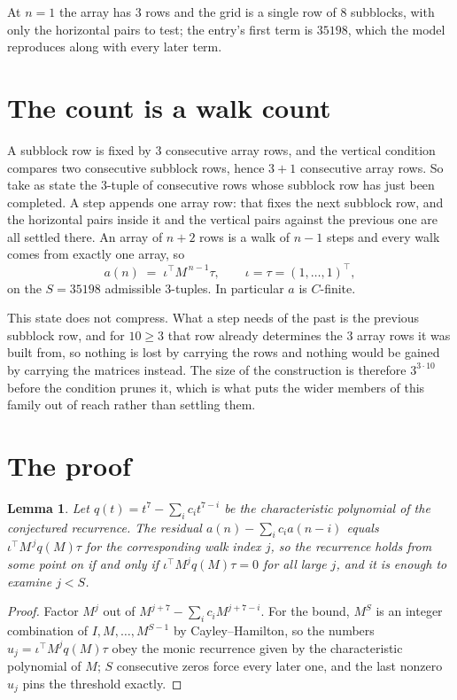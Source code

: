\documentclass[11pt,a4paper]{article}
\theoremstyle{plain}
\newtheorem{lemma}[theorem]{Lemma}
\theoremstyle{definition}
\begin{document}
At $n=1$ the array has $3$ rows and the grid is a single row of $8$
subblocks, with only the horizontal pairs to test; the entry's first term is
$35198$, which the model reproduces along with every later term.

\section{The count is a walk count}

A subblock row is fixed by $3$ consecutive array rows, and the vertical condition compares
two consecutive subblock rows, hence $3+1$ consecutive array rows. So take as state the
$3$-tuple of consecutive rows whose subblock row has just been completed. A step appends one
array row: that fixes the next subblock row, and the horizontal pairs inside it and the
vertical pairs against the previous one are all settled there. An array of $n+2$ rows is
a walk of $n-1$ steps and every walk comes from exactly one array, so
\[
a(n)\;=\;\iota^{\!\top}M^{\,n-1}\tau,\qquad\iota=\tau=(1,\dots,1)^{\!\top},
\]
on the $S=35198$ admissible $3$-tuples. In particular $a$ is $C$-finite.

This state does not compress. What a step needs of the past is the previous subblock row, and
for $10\ge3$ that row already determines the $3$ array rows it was built from, so nothing
is lost by carrying the rows and nothing would be gained by carrying the matrices instead. The
size of the construction is therefore $3^{3\cdot10}$ before the condition prunes
it, which is what puts the wider members of this family out of reach rather than settling them.

\section{The proof}

\begin{lemma}\label{lem:crit}
Let $q(t)=t^{7}-\sum_i c_it^{7-i}$ be the characteristic polynomial of the
conjectured recurrence. The residual $a(n)-\sum_ic_ia(n-i)$ equals
$\iota^{\!\top}M^{\,j}q(M)\tau$ for the corresponding walk index $j$, so the recurrence
holds from some point on if and only if $\iota^{\!\top}M^{j}q(M)\tau=0$ for all large $j$,
and it is enough to examine $j<S$.
\end{lemma}

\begin{proof}
Factor $M^{j}$ out of $M^{j+7}-\sum_ic_iM^{j+7-i}$. For the bound, $M^{S}$
is an integer combination of $I,M,\dots,M^{S-1}$ by Cayley--Hamilton, so the numbers
$u_j=\iota^{\!\top}M^{j}q(M)\tau$ obey the monic recurrence given by the characteristic
polynomial of $M$; $S$ consecutive zeros force every later one, and the last nonzero $u_j$
pins the threshold exactly.
\end{proof}
\end{document}
